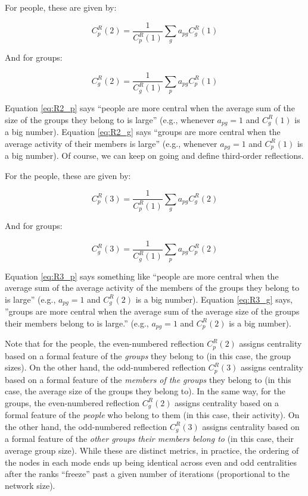 \documentclass[a4paper,fleqn]{cas-sc}
\begin{document}
For people, these are given by:

\begin{equation}
    C^R_p(2) = \frac{1}{C^R_p(1)}\sum_g a_{pg}C^R_g(1)
    \label{eq:R2_p}
\end{equation}

And for groups:

\begin{equation}
   C^R_g(2) = \frac{1}{C^R_g(1)}\sum_p a_{pg}C^R_p(1)
    \label{eq:R2_g}
\end{equation}

Equation \ref{eq:R2_p} says ``people are more central when the average sum of the size of the groups they belong to is large'' (e.g., whenever $a_{pg} = 1$ and $C^R_g(1)$ is a big number). Equation \ref{eq:R2_g} says ``groups are more central when the average activity of their members is large'' (e.g., whenever $a_{pg} = 1$ and $C^R_p(1)$ is a big number). Of course, we can keep on going and define third-order reflections. 

For the people, these are given by:

\begin{equation}
   C^R_p(3) = \frac{1}{C^R_p(1)}\sum_g a_{pg}C^R_g(2)
   \label{eq:R3_p}
\end{equation}

And for groups:

\begin{equation}
   C^R_g(3) = \frac{1}{C^R_g(1)}\sum_p a_{pg}C^R_p(2)
   \label{eq:R3_g}
\end{equation}

Equation \ref{eq:R3_p} says something like ``people are more central when the average sum of the average activity of the members of the groups they belong to is large'' (e.g., $a_{pg} = 1$ and $C^R_g(2)$ is a big number). Equation \ref{eq:R3_g} says, ''groups are more central when the average sum of the average size of the groups their members belong to is large.'' (e.g., $a_{pg} = 1$ and $C^R_p(2)$ is a big number).

Note that for the people, the even-numbered reflection $C^R_p(2)$ assigns centrality based on a formal feature of the \textit{groups} they belong to (in this case, the group sizes). On the other hand, the odd-numbered reflection $C^R_p(3)$ assigns centrality based on a formal feature of the \textit{members of the groups} they belong to (in this case, the average size of the groups they belong to). In the same way, for the groups, the even-numbered reflection $C^R_g(2)$ assigns centrality based on a formal feature of the \textit{people} who belong to them (in this case, their activity). On the other hand, the odd-numbered reflection $C^R_g(3)$ assigns centrality based on a formal feature of the \textit{other groups their members belong to} (in this case, their average group size). While these are distinct metrics, in practice, the ordering of the nodes in each mode ends up being identical across even and odd centralities after the ranks ``freeze'' past a given number of iterations (proportional to the network size). 
\end{document}
